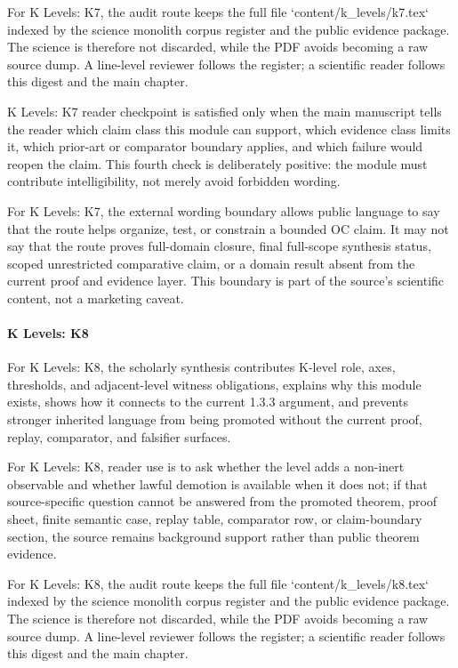 For K Levels: K7, the audit route keeps the full file `content/k\_levels/k7.tex` indexed by the science monolith corpus register and the public evidence package. The science is therefore not discarded, while the PDF avoids becoming a raw source dump. A line-level reviewer follows the register; a scientific reader follows this digest and the main chapter.


K Levels: K7 reader checkpoint is satisfied only when the main manuscript tells the reader which claim class this module can support, which evidence class limits it, which prior-art or comparator boundary applies, and which failure would reopen the claim. This fourth check is deliberately positive: the module must contribute intelligibility, not merely avoid forbidden wording.


For K Levels: K7, the external wording boundary allows public language to say that the route helps organize, test, or constrain a bounded OC claim. It may not say that the route proves full-domain closure, final full-scope synthesis status, scoped unrestricted comparative claim, or a domain result absent from the current proof and evidence layer. This boundary is part of the source's scientific content, not a marketing caveat.


\paragraph{K Levels: K8}

For K Levels: K8, the scholarly synthesis contributes K-level role, axes, thresholds, and adjacent-level witness obligations, explains why this module exists, shows how it connects to the current 1.3.3 argument, and prevents stronger inherited language from being promoted without the current proof, replay, comparator, and falsifier surfaces.


For K Levels: K8, reader use is to ask whether the level adds a non-inert observable and whether lawful demotion is available when it does not; if that source-specific question cannot be answered from the promoted theorem, proof sheet, finite semantic case, replay table, comparator row, or claim-boundary section, the source remains background support rather than public theorem evidence.


For K Levels: K8, the audit route keeps the full file `content/k\_levels/k8.tex` indexed by the science monolith corpus register and the public evidence package. The science is therefore not discarded, while the PDF avoids becoming a raw source dump. A line-level reviewer follows the register; a scientific reader follows this digest and the main chapter.


